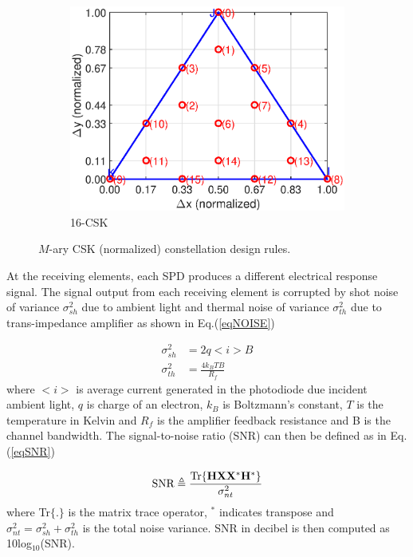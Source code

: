 \documentclass[10pt,letterpaper]{article}
\newcommand{\vm}[1]{{\bf{#1}}}
\begin{document}
\begin{figure}[b]
\begin{subfigure}{0.32\textwidth}
			\includegraphics[trim={0.05in 0.0in 0.25in 0.2in}, clip=true, width=\textwidth]{CBCrules16.eps}
			\caption{16-CSK}
			\label{fig16Const}
		\end{subfigure}
	\caption{$M$-ary CSK (normalized) constellation design rules.}
	\label{figConst}
\end{figure}

At the receiving elements, each SPD produces a different electrical response signal. The signal output from each receiving element is corrupted by shot noise of variance $\sigma^{2}_{sh}$ due to ambient light and thermal noise of variance $\sigma^{2}_{th}$ due to trans-impedance amplifier as shown in Eq.(\ref{eqNOISE})

\begin{equation}
	\begin{aligned}
	\sigma^{2}_{sh} &= 2q<i>B\\
	\sigma^{2}_{th} &= \frac{4k_{B}TB}{R_{f}}
\end{aligned}
\label{eqNOISE}
\end{equation}
where $<i>$ is average current generated in the photodiode due incident ambient light, $q$ is charge of an electron, $k_{B}$ is Boltzmann's constant, $T$ is the temperature in Kelvin and $R_{f}$ is the amplifier feedback resistance and B is the channel bandwidth. The signal-to-noise ratio (SNR) can then be defined as in Eq.(\ref{eqSNR})

\begin{equation}
	\text{SNR} \triangleq \frac{\text{Tr}\{\vm{H}\vm{X}\vm{X}^{*}\vm{H}^{*}\}}{\sigma^{2}_{nt}}
	\label{eqSNR}
\end{equation}
where Tr$\{.\}$ is the matrix trace operator, $^{*}$ indicates transpose and $\sigma^{2}_{nt}=\sigma^{2}_{sh}+\sigma^{2}_{th}$ is the total noise variance. SNR in decibel is then computed as 10log$^{ }_{10}$(SNR).
\end{document}
